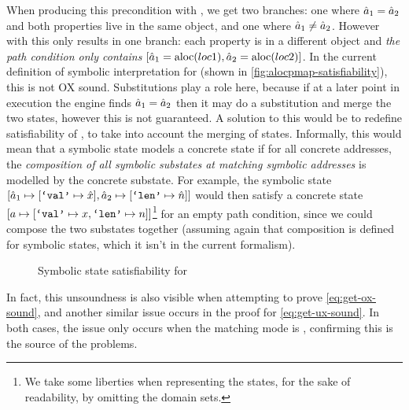 When producing this precondition with \PMap, we get two branches: one where ${\hat{a}_1=\hat{a}_2}$ and both properties live in the same object, and one where ${\hat{a}_1\neq \hat{a}_2}$. However with \ALocPMap{} this only results in one branch: each property is in a different object and \emph{the path condition only contains} $[\hat{a}_1=\text{aloc}(loc1), \hat{a}_2=\text{aloc}(loc2)]$. In the current definition of symbolic interpretation for \ALocPMap{} (shown in \autoref{fig:alocpmap-satisfiability}), this is not OX sound. Substitutions play a role here, because if at a later point in execution the engine finds $\hat{a}_1=\hat{a}_2$ then it may do a substitution and merge the two states, however this is not guaranteed. A solution to this would be to redefine satisfiability of \ALocPMap{}, to take into account the merging of states. Informally, this would mean that a symbolic state models a concrete state if for all concrete addresses, the \emph{composition of all symbolic substates at matching symbolic addresses} is modelled by the concrete substate. For example, the symbolic state $[\hat{a}_1 \mapsto [\texttt{`val'} \mapsto \hat{x}], \hat{a}_2 \mapsto [\texttt{`len'}\mapsto \hat{n}]]$ would then satisfy a concrete state $[ a \mapsto [\texttt{`val'} \mapsto x, \texttt{`len'}\mapsto n]]$\footnote{We take some liberties when representing the states, for the sake of readability, by omitting the domain sets.} for an empty path condition, since we could compose the two substates together (assuming again that composition is defined for symbolic states, which it isn't in the current formalism).

\begin{figure}
	\centering
	\begin{mathpar}
	\end{mathpar}
\caption{Symbolic state satisfiability for \ALocPMap}
\label{fig:alocpmap-satisfiability}
\end{figure}

In fact, this unsoundness is also visible when attempting to prove \ref{eq:get-ox-sound}, and another similar issue occurs in the proof for \ref{eq:get-ux-sound}. In both cases, the issue only occurs when the matching mode is , confirming this is the source of the problems.

